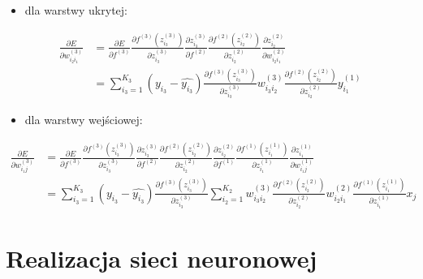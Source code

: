 \documentclass[12pt,twoside]{article}
\begin{document}
\begin{itemize}[resume]
	\item dla warstwy ukrytej:
\end{itemize}
\begin{equation}
	\begin{aligned}
		\frac{\partial E}{\partial w_{i_2i_1}^{(3)}}&= \frac{\partial E}{\partial f^{(3)}}\frac{\partial f^{(3)}(z_{i_3}^{(3)})}{\partial z_{i_3}^{(3)}}\frac{\partial z_{i_3}^{(3)}}{\partial f^{(2)}} \frac{\partial f^{(2)}(z_{i_2}^{(2)})}{\partial z_{i_2}^{(2)}}\frac{\partial z_{i_2}^{(2)}}{\partial w_{i_2i_1}^{(2)}}\\
		&= \sum_{i_3=1}^{K_3} (y_{i_3} - \hat{y_{i_3}}) \frac{\partial f^{(3)}(z_{i_3}^{(3)})}{\partial z_{i_3}^{(3)}} w_{i_3i_2}^{(3)}
		\frac{\partial f^{(2)}(z_{i_2}^{(2)})}{\partial z_{i_2}^{(2)}} y_{i_1}^{(1)}
	\end{aligned}
\end{equation}

\begin{itemize}[resume]
	\item dla warstwy wejściowej:
\end{itemize}
\begin{equation}
	\begin{aligned}
		\frac{\partial E}{\partial w_{i_1j}^{(3)}}&= \frac{\partial E}{\partial f^{(3)}}\frac{\partial f^{(3)}(z_{i_3}^{(3)})}{\partial z_{i_3}^{(3)}}\frac{\partial z_{i_3}^{(3)}}{\partial f^{(2)}} \frac{\partial f^{(2)}(z_{i_2}^{(2)})}{\partial z_{i_2}^{(2)}}\frac{\partial z_{i_2}^{(2)}}{\partial f^{(1)}}
		\frac{\partial f^{(1)}(z_{i_1}^{(1)})}{\partial z_{i_1}^{(1)}}\frac{\partial z_{i_1}^{(1)}}{\partial w_{i_1j}^{(1)}}\\
		&= \sum_{i_3=1}^{K_3} (y_{i_3} - \hat{y_{i_3}}) \frac{\partial f^{(3)}(z_{i_3}^{(3)})}{\partial z_{i_3}^{(3)}} \sum_{i_2=1}^{K_2} w_{i_3i_2}^{(3)}
		\frac{\partial f^{(2)}(z_{i_2}^{(2)})}{\partial z_{i_2}^{(2)}} w_{i_2i_1}^{(2)} \frac{\partial f^{(1)}(z_{i_1}^{(1)})}{\partial z_{i_1}^{(1)}} x_j
	\end{aligned}
\end{equation}
\newpage
\section{Realizacja sieci neuronowej}
\end{document}

